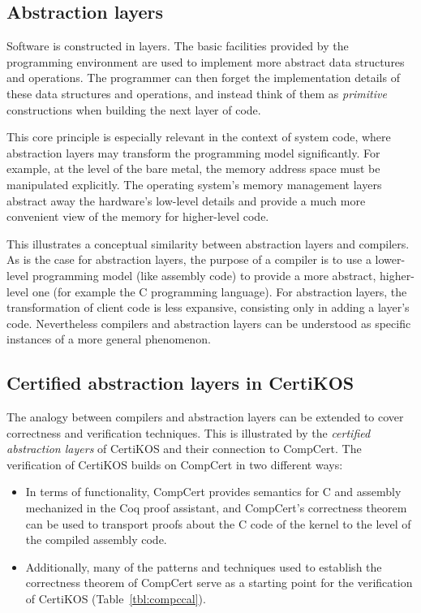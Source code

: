 \documentclass[11pt,oneside,draft]{book}
\theoremstyle{definition}
\begin{document}
\subsection{Abstraction layers} %

Software is constructed in layers.
The basic facilities provided by the programming environment
are used to implement more abstract data structures and operations.
The programmer can then forget the implementation details
of these data structures and operations,
and instead think of them as \emph{primitive} constructions
when building the next layer of code.

This core principle is especially relevant
in the context of system code,
where abstraction layers
may transform the programming model significantly.
For example,
at the level of the bare metal,
the memory address space must be manipulated explicitly.
The operating system's memory management layers
abstract away the hardware's low-level details and
provide a much more convenient view of the memory
for higher-level code.

This illustrates a conceptual similarity between
abstraction layers and compilers.
As is the case for abstraction layers,
the purpose of a compiler is to use a lower-level programming model
(like assembly code)
to provide a more abstract, higher-level one
(for example the C programming language).
For abstraction layers,
the transformation of client code
is less expansive,
consisting only in adding a layer's code.
Nevertheless compilers and abstraction layers
can be understood as specific instances
of a more general phenomenon.


\subsection{Certified abstraction layers in CertiKOS} %

The analogy between compilers and abstraction layers
can be extended to cover correctness and verification techniques.
This is illustrated by the \emph{certified abstraction layers}
of CertiKOS and their connection to CompCert.
The verification of CertiKOS builds on CompCert
in two different ways:
\begin{itemize}
\item
  In terms of functionality,
  CompCert provides semantics for C and assembly
  mechanized in the Coq proof assistant,
  and CompCert's correctness theorem
  can be used to transport proofs about the C code of the kernel
  to the level of the compiled assembly code.
\item
  Additionally,
  many of the patterns and techniques used
  to establish the correctness theorem of CompCert
  serve as a starting point for
  the verification of CertiKOS
  (Table~\ref{tbl:compccal}).
\end{itemize}
\end{document}

